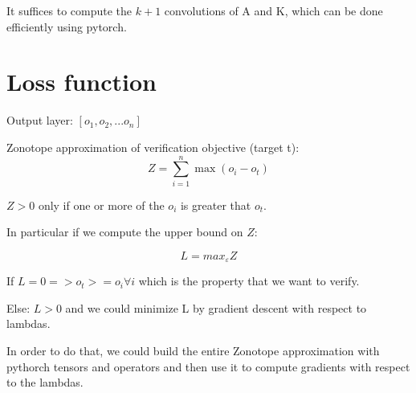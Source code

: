 \documentclass{article}
\newcommand{\eps}{\varepsilon}
\begin{document}
It suffices to compute the $k+1$ convolutions of A and K, which can be done efficiently using pytorch.



\section{Loss function}

Output layer: $[o_1, o_2, ... o_n]$

Zonotope approximation of verification objective (target t):
\begin{equation}
Z = \sum_{i=1}^{n} \max(o_i - o_t)
\end{equation}

$Z > 0$ only if one or more of the $o_i$ is greater that $o_t$.

In particular if we compute the upper bound on $Z$:

\begin{equation}
L = max_\eps Z
\end{equation}

If $L = 0 => o_t >= o_i \forall i$ which is the property that we want to verify.

Else: $L > 0$ and we could minimize L by gradient descent with respect to lambdas.

In order to do that, we could build the entire Zonotope approximation with pythorch tensors and operators and then use it to compute gradients with respect to the lambdas.
\end{document}
